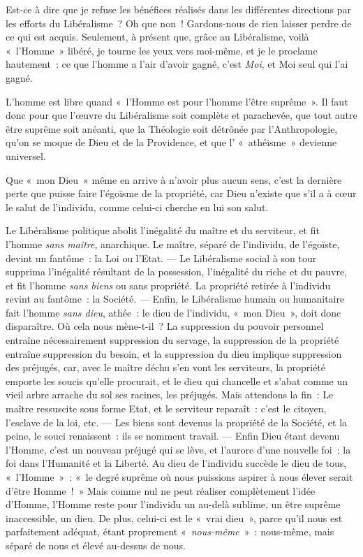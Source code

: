 \documentclass[french,twoside]{book} %
\begin{document}
Est-ce à dire que je refuse les bénéfices réalisés dans les différentes directions par les efforts du Libéralisme ? Oh que non ! Gardons-nous de rien laisser perdre de ce qui est acquis. Seulement, à présent que, grâce au Libéralisme, voilà « l’Homme » libéré, je tourne les yeux vers moi-même, et je le proclame hautement : ce que l’homme a l’air d’avoir gagné, c’est \emph{Moi}, et Moi seul qui l’ai gagné.\par
L’homme est libre quand « l’Homme est pour l’homme l’être suprême ». Il faut donc pour que l’œuvre du Libéralisme soit complète et parachevée, que tout autre être suprême soit anéanti, que la Théologie soit détrônée par l’Anthropologie, qu’on se moque de Dieu et de la Providence, et que l’ « athéisme » devienne universel.\par
Que « mon Dieu » même en arrive à n’avoir plus aucun sens, c’est la dernière perte que puisse faire l’égoïsme de la propriété, car Dieu n’existe que s’il a à cœur le salut de l’individu, comme celui-ci cherche en lui son salut.\par
Le Libéralisme politique abolit l’inégalité du maître et du serviteur, et fit l’homme \emph{sans maître}, anarchique. Le maître, séparé de l’individu, de l’égoïste, devint  un fantôme : la Loi ou l’Etat. — Le Libéralisme social à son tour supprima l’inégalité résultant de la possession, l’inégalité du riche et du pauvre, et fit l’homme \emph{sans biens} ou sans propriété. La propriété retirée à l’individu revint au fantôme : la Société. — Enfin, le Libéralisme humain ou humanitaire fait l’homme \emph{sans dieu}, athée : le dieu de l’individu, « mon Dieu », doit donc disparaître. Où cela nous mène-t-il ? La suppression du pouvoir personnel entraîne nécessairement suppression du servage, la suppression de la propriété entraîne suppression du besoin, et la suppression du dieu implique suppression des préjugés, car, avec le maître déchu s’en vont les serviteurs, la propriété emporte les soucis qu’elle procurait, et le dieu qui chancelle et s’abat comme un vieil arbre arrache du sol ses racines, les préjugés. Mais attendons la fin : Le maître ressuscite sous forme Etat, et le serviteur reparaît : c’est le citoyen, l’esclave de la loi, etc. — Les biens sont devenus la propriété de la Société, et la peine, le souci renaissent : ils se nomment travail. — Enfin Dieu étant devenu l’Homme, c’est un nouveau préjugé qui se lève, et l’aurore d’une nouvelle foi : la foi dans l’Humanité et la Liberté. Au dieu de l’individu succède le dieu de tous, « l’Homme » : « le degré suprême où nous puissions aspirer à nous élever serait d’être Homme ! » Mais comme nul ne peut réaliser complètement l’idée d’Homme, l’Homme reste pour l’individu un au-delà sublime, un être suprême inaccessible, un dieu. De plus, celui-ci est le « vrai dieu », parce qu’il nous est parfaitement adéquat, étant proprement « \emph{nous-même} » : nous-même, mais séparé de nous et élevé au-dessus de nous.
\end{document}
